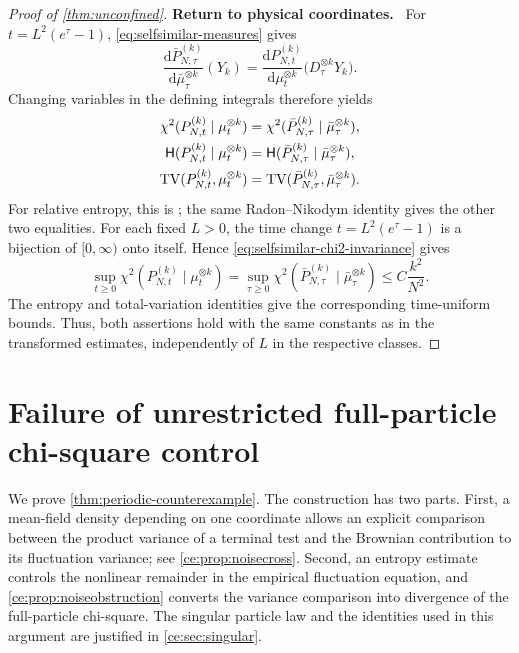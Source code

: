 \documentclass[11pt,reqno]{amsart}
\numberwithin{equation}{section}
\theoremstyle{plain}
\theoremstyle{remark}
\newcommand{\Hr}{\mathsf H}\newcommand{\dd}{\,\mathrm d}
\newcommand{\parheading}[1]{\par\medskip\noindent\textbf{#1}\ }
\begin{document}
\begin{proof}[Proof of \cref{thm:unconfined}]
\parheading{Return to physical coordinates.}
For $t=L^2(e^\tau-1)$, \eqref{eq:selfsimilar-measures} gives
\begin{equation}\label{eq:selfsimilar-RN-identity}
 \frac{\mathrm d\bar P_{N,\tau}^{(k)}}{\mathrm d\bar\mu_\tau^{\otimes k}}(Y_k)
 =\frac{\mathrm dP_{N,t}^{(k)}}{\mathrm d\mu_t^{\otimes k}}
       \bigl(D_\tau^{\otimes k}Y_k\bigr).
\end{equation}
Changing variables in the defining integrals therefore yields
\begin{align}
 \chi^2(P_{N,t}^{(k)}\mid\mu_t^{\otimes k})
 &=\chi^2(\bar P_{N,\tau}^{(k)}\mid\bar\mu_\tau^{\otimes k}),
 \label{eq:selfsimilar-chi2-invariance}\\
 \Hr(P_{N,t}^{(k)}\mid\mu_t^{\otimes k})
 &=\Hr(\bar P_{N,\tau}^{(k)}\mid\bar\mu_\tau^{\otimes k}),
 \label{eq:selfsimilar-entropy-invariance}\\
 \TV(P_{N,t}^{(k)},\mu_t^{\otimes k})
 &=\TV(\bar P_{N,\tau}^{(k)},\bar\mu_\tau^{\otimes k}).
 \label{eq:selfsimilar-TV-invariance}
\end{align}
For relative entropy, this is \cite[Lemma~2.2]{RSselfsimilar}; the same Radon--Nikodym identity gives the other two equalities. For each fixed $L>0$, the time change $t=L^2(e^\tau-1)$ is a bijection of $[0,\infty)$ onto itself. Hence \eqref{eq:selfsimilar-chi2-invariance} gives
\begin{equation}\label{eq:selfsimilar-time-supremum}
 \sup_{t\ge0}\chi^2(P_{N,t}^{(k)}\mid\mu_t^{\otimes k})
 =\sup_{\tau\ge0}\chi^2(\bar P_{N,\tau}^{(k)}\mid\bar\mu_\tau^{\otimes k})
 \le C\frac{k^2}{N^2}.
\end{equation}
The entropy and total-variation identities give the corresponding time-uniform bounds. Thus, both assertions hold with the same constants as in the transformed estimates, independently of $L$ in the respective classes.
\end{proof}

\par\endgroup

\begingroup

\section{Failure of unrestricted full-particle chi-square control}\label{sec:periodic-counterexample-proof}
We prove \cref{thm:periodic-counterexample}. The construction has two parts. First, a mean-field density depending on one coordinate allows an explicit comparison between the product variance of a terminal test and the Brownian contribution to its fluctuation variance; see \cref{ce:prop:noisecross}. Second, an entropy estimate controls the nonlinear remainder in the empirical fluctuation equation, and \cref{ce:prop:noiseobstruction} converts the variance comparison into divergence of the full-particle chi-square. The singular particle law and the identities used in this argument are justified in \cref{ce:sec:singular}.
\end{document}

